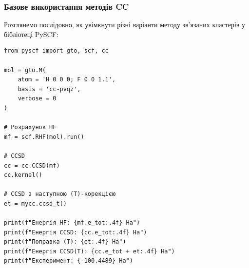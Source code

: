 \subsubsection{Базове використання методів CC}

Розглянемо послідовно, як увімкнути різні варіанти методу зв'язаних кластерів
у бібліотеці PySCF:

\begin{verbatim}
from pyscf import gto, scf, cc

mol = gto.M(
    atom = 'H 0 0 0; F 0 0 1.1',
    basis = 'cc-pvqz',
    verbose = 0
)

# Розрахунок HF
mf = scf.RHF(mol).run()

# CCSD
cc = cc.CCSD(mf)
cc.kernel()

# CCSD з наступною (T)-корекцією
et = mycc.ccsd_t()

print(f"Енергія HF: {mf.e_tot:.4f} Ha")
print(f"Енергія CCSD: {cc.e_tot:.4f} Ha")
print(f"Поправка (T): {et:.4f} Ha")
print(f"Енергія CCSD(T): {cc.e_tot + et:.4f} Ha")
print(f"Експеримент: {-100.4489} Ha")
\end{verbatim}

